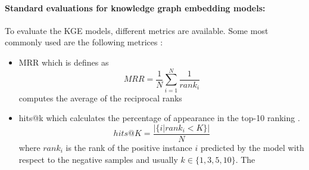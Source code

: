 \paragraph{\textbf{Standard evaluations for knowledge graph embedding models:}}  
To evaluate the \ac{KGE} models, different metrics are available.
Some most commonly used are the following metrices \cite{kotnis2017analysis}:
\begin{itemize}
    \item 
    \ac{MRR} which is defines as
    $$MRR = \frac{1}{N} \sum_{i=1}^{N}\frac{1}{rank_i}$$
    computes the average of the reciprocal ranks \cite{zhang2021efficient}
    
    \item 
    hits@k which calculates the percentage of appearance in the top-10
ranking \cite{zhang2021efficient}.
    $$hits@K = \frac{|\{i | rank_i < K\}|}{N}$$
    where $rank_i$ is the rank of the positive instance $i$ predicted by the
    model with respect to the negative samples and usually $k \in \{1,3,5,10\}$.
    The 
\end{itemize}

